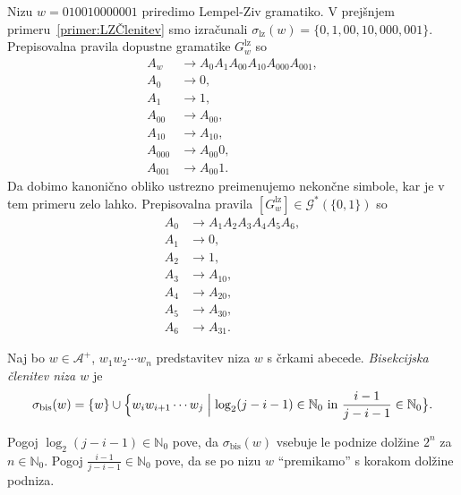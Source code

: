 \documentclass[fin1, tisk]{fmfdelo}
\newcommand{\N}{\mathbb{N}}
\newcommand{\A}{\mathcal{A}}
\newcommand{\G}{\mathcal{G}}
\theoremstyle{definition}
\begin{document}
\begin{primer}
    Nizu $w = 010010000001$ priredimo Lempel-Ziv gramatiko. V prejšnjem 
    primeru~\ref{primer:LZČlenitev} smo izračunali 
    $\sigma_{\text{lz}}(w) = \{ 0, 1, 00, 10, 000, 001 \}$. Prepisovalna pravila dopustne 
    gramatike $G^\text{lz}_w$ so
    \begin{align*}
        A_w &\rightarrow A_0A_1A_{00}A_{10}A_{000}A_{001}, \\
        A_0 &\rightarrow 0, \\
        A_1 &\rightarrow 1, \\
        A_{00} &\rightarrow A_00, \\
        A_{10} &\rightarrow A_10, \\
        A_{000} &\rightarrow A_{00}0, \\
        A_{001} &\rightarrow A_{00}1.
    \end{align*}
    Da dobimo kanonično obliko ustrezno preimenujemo nekončne simbole, kar
    je v tem primeru zelo lahko. Prepisovalna pravila $[G^\text{lz}_w] \in \G^*(\{ 0, 1 \})$ so
    \begin{align*}
        A_0 &\rightarrow A_1A_2A_3A_4A_5A_6, \\
        A_1 &\rightarrow 0, \\
        A_2 &\rightarrow 1, \\
        A_3 &\rightarrow A_10, \\
        A_4 &\rightarrow A_20, \\
        A_5 &\rightarrow A_30, \\
        A_6 &\rightarrow A_31.
    \end{align*}
\end{primer}

\begin{definicija}
    Naj bo $w \in \A^+$, $w_1w_2 \cdots w_n$ predstavitev niza $w$ s črkami abecede. 
    \emph{Bisekcijska členitev niza $w$} je
    \[
        \sigma_{\text{bis}}(w) = \{ w \} \cup \Bigl\{ w_iw_{i+1} \cdots w_j \Bigm| \log_2(j-i-1) \in \N_0
        \text{ in } \frac{i-1}{j-i-1} \in \N_0 \bigr\}.
    \]
\end{definicija}

\begin{opomba}
    Pogoj $\log_2(j-i-1) \in \N_0$ pove, da $\sigma_{\text{bis}}(w)$ vsebuje le podnize dolžine
    $2^n$ za $n \in \N_0$.  Pogoj $\frac{i-1}{j-i-1} \in \N_0$ pove, da se po nizu $w$ 
    ``premikamo'' s korakom dolžine podniza.
\end{opomba}
\end{document}
